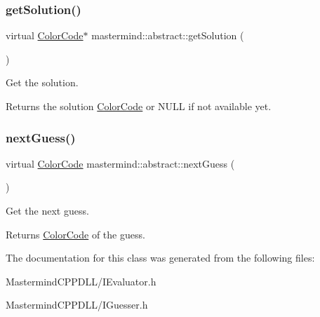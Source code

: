 \subsubsection{\texorpdfstring{get\+Solution()}{getSolution()}}
{\footnotesize\ttfamily virtual \hyperlink{classmastermind_1_1_color_code}{Color\+Code}$\ast$ mastermind\+::abstract\+::get\+Solution (\begin{DoxyParamCaption}{ }\end{DoxyParamCaption})\hspace{0.3cm}{\ttfamily [pure virtual]}}



Get the solution. 

\begin{DoxyReturn}{Returns}
the solution \hyperlink{classmastermind_1_1_color_code}{Color\+Code} or N\+U\+LL if not available yet. 
\end{DoxyReturn}
\hypertarget{classmastermind_1_1abstract_a2aa68c24bf1d51834fe7c9e02d827fa7}{}\label{classmastermind_1_1abstract_a2aa68c24bf1d51834fe7c9e02d827fa7} 
\subsubsection{\texorpdfstring{next\+Guess()}{nextGuess()}}
{\footnotesize\ttfamily virtual \hyperlink{classmastermind_1_1_color_code}{Color\+Code} mastermind\+::abstract\+::next\+Guess (\begin{DoxyParamCaption}{ }\end{DoxyParamCaption})\hspace{0.3cm}{\ttfamily [pure virtual]}}



Get the next guess. 

\begin{DoxyReturn}{Returns}
\hyperlink{classmastermind_1_1_color_code}{Color\+Code} of the guess. 
\end{DoxyReturn}


The documentation for this class was generated from the following files\+:\begin{DoxyCompactItemize}
\item 
Mastermind\+C\+P\+P\+D\+L\+L/I\+Evaluator.\+h\item 
Mastermind\+C\+P\+P\+D\+L\+L/I\+Guesser.\+h\end{DoxyCompactItemize}
